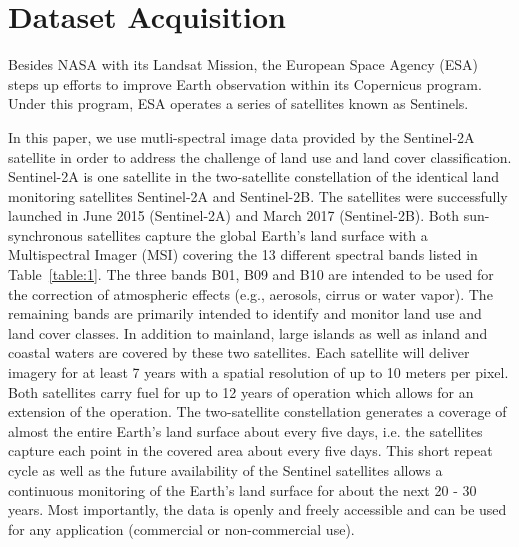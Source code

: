 \documentclass[journal]{IEEEtran}
\begin{document}
\section{Dataset Acquisition}

Besides NASA with its Landsat Mission, the European Space Agency (ESA) steps up efforts to improve Earth observation within its Copernicus program. Under this program, ESA operates a series of satellites known as Sentinels. 

In this paper, we use mutli-spectral image data provided by the Sentinel-2A satellite in order to address the challenge of land use and land cover classification. Sentinel-2A is one satellite in the two-satellite constellation of the identical land monitoring satellites Sentinel-2A and Sentinel-2B. The satellites were successfully launched in June 2015 (Sentinel-2A) and March 2017 (Sentinel-2B). Both sun-synchronous satellites capture the global Earth's land surface with a Multispectral Imager (MSI) covering the 13 different spectral bands listed in Table~\ref{table:1}. The three bands B01, B09 and B10 are intended to be used for the correction of atmospheric effects (e.g., aerosols, cirrus or water vapor). The remaining bands are primarily intended to identify and monitor land use and land cover classes. In addition to mainland, large islands as well as inland and coastal waters are covered by these two satellites. Each satellite will deliver imagery for at least 7 years with a spatial resolution of up to 10 meters per pixel. Both satellites carry fuel for up to 12 years of operation which allows for an extension of the operation. The two-satellite constellation generates a coverage of almost the entire Earth's land surface about every five days, i.e. the satellites capture each point in the covered area about every five days. This short repeat cycle as well as the future availability
of the Sentinel satellites allows a continuous monitoring of the Earth's land surface for about the next 20 - 30 years. Most importantly, the data is openly and freely accessible and can be used for any application (commercial or non-commercial use). 


\end{document}
